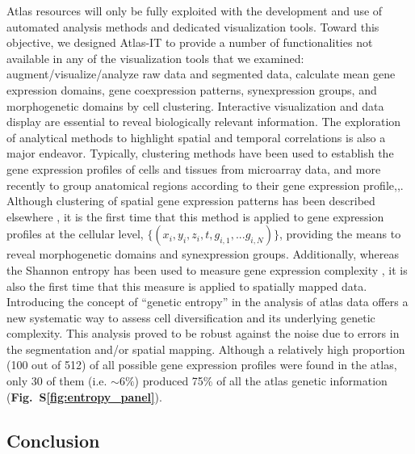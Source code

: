 Atlas resources will only be fully exploited with the development and use of automated analysis methods and dedicated visualization tools. Toward this objective, we designed Atlas-IT to provide a number of functionalities not available in any of the visualization tools that we examined: augment/visualize/analyze raw data and segmented data, calculate mean gene expression domains, gene coexpression patterns, synexpression groups, and morphogenetic domains by cell clustering. Interactive visualization and data display are essential to reveal biologically relevant information. The exploration of analytical methods to highlight spatial and temporal correlations is also a major endeavor. Typically, clustering methods have been used to establish the gene expression profiles of cells and tissues from microarray data, and more recently to group anatomical regions according to their gene expression profile\cite{lein2007genome},\cite{fisher2008integrating},\cite{frise2010systematic}. Although clustering of spatial gene expression patterns has been described elsewhere \cite{venkataraman2008emage}, it is the first time that this method is applied to gene expression profiles at the cellular level, $\{(x_i,y_i,z_i,t,g_{i,1},...g_{i,N})\}$, providing the means to reveal morphogenetic domains and synexpression groups. Additionally, whereas the Shannon entropy has been used to measure gene expression complexity \cite{martinez2008defining}, it is also the first time that this measure is applied to spatially mapped data. Introducing the concept of ``genetic entropy'' in the analysis of atlas data offers a new systematic way to assess cell diversification and its underlying genetic complexity. This analysis proved to be robust against the noise due to errors in the segmentation and/or spatial mapping. Although a relatively high proportion (100 out of 512) of all possible gene expression profiles were found in the atlas, only 30 of them (i.e. $\sim6\%$) produced 75\% of all the atlas genetic information (\textbf{Fig.~S\ref{fig:entropy_panel}}).



\subsection*{Conclusion}



